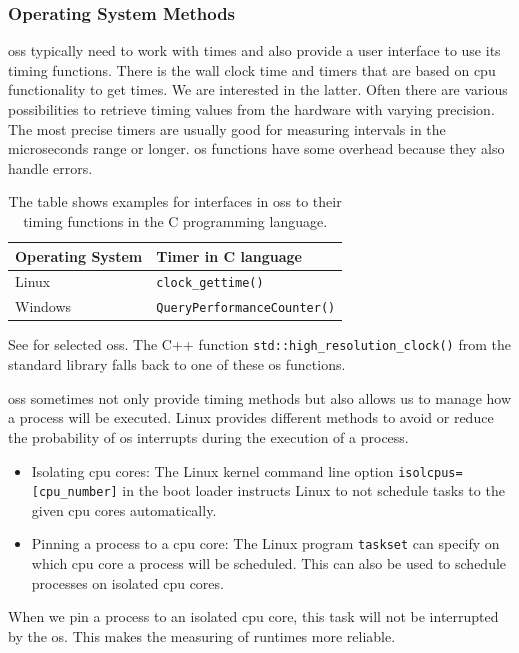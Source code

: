\subsubsection{Operating System Methods}
\acp{os} typically need to work with times and also provide a user interface to use its timing functions.
There is the wall clock time and timers that are based on \ac{cpu} functionality to get times.
We are interested in the latter.
Often there are various possibilities to retrieve timing values from the hardware with varying precision.
The most precise timers are usually good for measuring intervals in the microseconds range or longer.
\ac{os} functions have some overhead because they also handle errors.
\begin{table}
    \centering
    \begin{tabular}{@{}ll@{}}
        \toprule
        Operating System & Timer in C language \\
        \midrule
        Linux & \lstinline|clock_gettime()| \\
        Windows & \lstinline|QueryPerformanceCounter()| \\
        \bottomrule
    \end{tabular}
    \caption[Operating System interfaces to their timing functions]
    {
        The table shows examples for interfaces in \acp{os} to their timing functions in the C programming language.
    }
    \label{tab:approach:timing_functions}
\end{table}
See  for selected \acp{os}.
The C++ function \lstinline|std::high_resolution_clock()| from the standard library falls back to one of these \ac{os} functions.

\acp{os} sometimes not only provide timing methods but also allows us to manage how a process will be executed.
Linux provides different methods to avoid or reduce the probability of \ac{os} interrupts during the execution of a process.
\begin{itemize}
    \item Isolating \ac{cpu} cores: 
    The Linux kernel command line option \lstinline|isolcpus=[cpu_number]| in the boot loader instructs Linux to not schedule tasks to the given \ac{cpu} cores automatically.
    \item Pinning a process to a \ac{cpu} core: 
    The Linux program \lstinline|taskset| can specify on which \ac{cpu} core a process will be scheduled.
    This can also be used to schedule processes on isolated \ac{cpu} cores.
\end{itemize}
When we pin a process to an isolated \ac{cpu} core, this task will not be interrupted by the \ac{os}.
This makes the measuring of runtimes more reliable.

